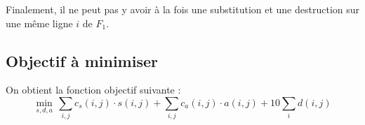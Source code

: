 \documentclass[a4paper, 10pt, french]{article}
\begin{document}
\noindent Finalement, il ne peut pas y avoir à la fois une substitution et une destruction sur une même ligne $i$ de $F_1$.
\\

\subsection*{Objectif à minimiser}

On obtient la fonction objectif suivante :
\begin{equation*}
\min_{s, d, a} \, \sum\limits_{i,j} c_s(i, j) \cdot s(i, j) + \sum\limits_{i,j} c_a(i, j) \cdot a(i, j) + 10 \sum\limits_i d(i, j)
\end{equation*}





\end{document}
